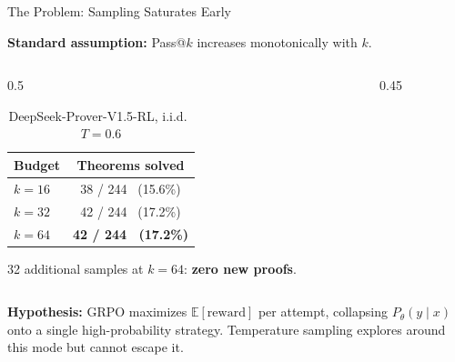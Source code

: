 \documentclass[aspectratio=169]{beamer}
\begin{document}
\begin{frame}{The Problem: Sampling Saturates Early}

\textbf{Standard assumption:} Pass@$k$ increases monotonically with $k$.

\vspace{0.5em}
\begin{columns}
\begin{column}{0.5\textwidth}
\begin{table}
\centering
\begin{tabular}{lc}
\toprule
\textbf{Budget} & \textbf{Theorems solved} \\
\midrule
$k = 16$ & 38 / 244 ~(15.6\%) \\
$k = 32$ & 42 / 244 ~(17.2\%) \\
$k = 64$ & \textbf{42 / 244 ~(17.2\%)} \\
\bottomrule
\end{tabular}
\caption*{\small DeepSeek-Prover-V1.5-RL, i.i.d.\ $T{=}0.6$}
\end{table}

\vspace{0.3em}
32 additional samples at $k{=}64$: \textbf{zero new proofs}.
\end{column}
\begin{column}{0.45\textwidth}
\centering
{}
\end{column}
\end{columns}

\vspace{0.5em}
\textbf{Hypothesis:} GRPO maximizes $\mathbb{E}[\text{reward}]$ per attempt, collapsing $P_\theta(y \mid x)$ onto a single high-probability strategy. Temperature sampling explores around this mode but cannot escape it.
\end{frame}
\end{document}
